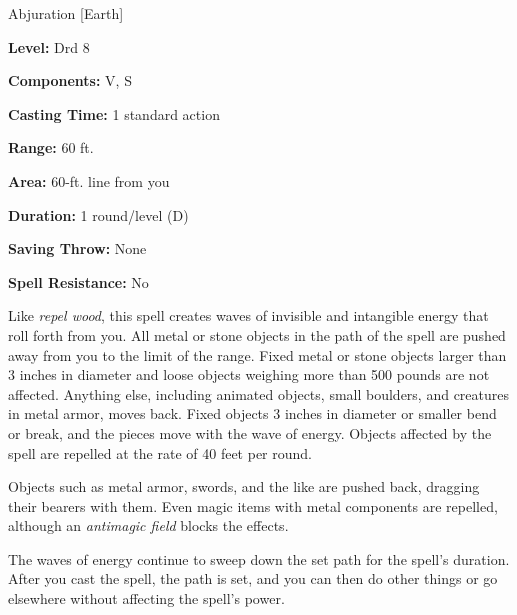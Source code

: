 
Abjuration [Earth]

\textbf{Level:} Drd 8

\textbf{Components:} V, S

\textbf{Casting Time:} 1 standard action

\textbf{Range:} 60 ft.

\textbf{Area:} 60-ft. line from you

\textbf{Duration:} 1 round/level (D)

\textbf{Saving Throw:} None

\textbf{Spell Resistance:} No

Like \textit{repel wood}, this spell creates waves of invisible and intangible 
energy that roll forth from you. All metal or stone objects in the path of the 
spell are pushed away from you to the limit of the range. Fixed metal or stone 
objects larger than 3 inches in diameter and loose objects weighing more than 500 
pounds are not affected. Anything else, including animated objects, small boulders, 
and creatures in metal armor, moves back. Fixed objects 3 inches in diameter or 
smaller bend or break, and the pieces move with the wave of energy. Objects affected 
by the spell are repelled at the rate of 40 feet per round.

Objects such as metal armor, swords, and the like are pushed back, dragging their 
bearers with them. Even magic items with metal components are repelled, although 
an \textit{antimagic field} blocks the effects.

The waves of energy continue to sweep down the set path for the spell's duration. 
After you cast the spell, the path is set, and you can then do other things or 
go elsewhere without affecting the spell's power.

